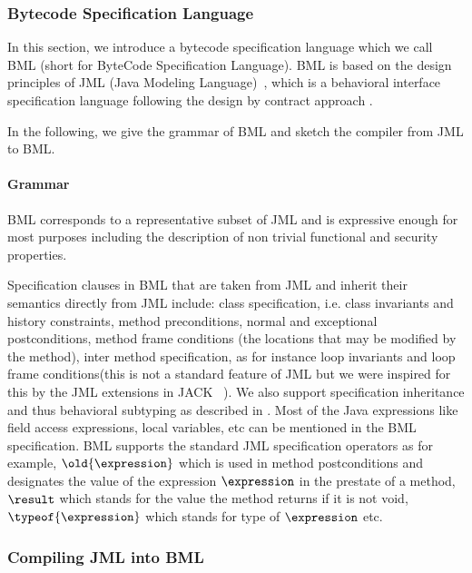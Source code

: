 \subsubsection{Bytecode Specification Language}\label{bcSpecLg}

In this section, we introduce a bytecode specification language which we call BML (short for ByteCode Specification Language).
 BML is based on the design principles of JML (Java Modeling Language)~\cite{JMLRefMan}, which is a behavioral interface specification 
language following the design by contract approach \cite{M97oos}.

In the following, we give the grammar of BML and sketch the compiler from JML to BML. 

\paragraph{Grammar} \label{grammar}


BML corresponds to a representative subset of JML and is expressive enough for most purposes including the description of non trivial functional and security properties.


 Specification clauses in BML that are taken from JML and inherit their semantics directly from JML include:
class specification, i.e. class invariants and history constraints, 
  method preconditions, normal and exceptional postconditions, method frame conditions (the locations that may be modified by the method), inter method specification, as for instance loop invariants and loop frame conditions(this is not a standard feature of JML but we were inspired for this by the JML extensions in JACK ~\cite{BRL-JACK}). 
We also support specification inheritance and thus behavioral subtyping as described in \cite{Dhara-Leavens96}. Most of the Java expressions like field access expressions, local variables, etc can be mentioned in the BML specification.
BML supports the standard JML specification operators as for example, $\old{\expression}$ which is used in method postconditions and
 designates the value of the expression $\expression$ in the prestate of a method, $ \result$ which stands for the value the method
returns if it is not void,  $\typeof{\expression}$ which stands for type of $\expression$ etc.  

\subsubsection{Compiling JML into BML}\label{comJML}


